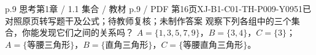 \par\noindent\begin{minipage}{\linewidth}
\begin{bankitem}{p.9 思考}{第1章 / 1.1 集合 / 教材 p.9 / PDF 第16页}{XJ-B1-C01-TH-P009-Y0951}{已对照原页转写题干及公式；待教师复核；未制作答案}
观察下列各组中的三个集合，你能发现它们之间的关系吗？
$A=\{1,3,5,7,9\}$，$B=\{3,4\}$，$C=\{3\}$；
$A=\{\text{等腰三角形}\}$，$B=\{\text{直角三角形}\}$，$C=\{\text{等腰直角三角形}\}$。
\end{bankitem}
\end{minipage}\par\medskip
